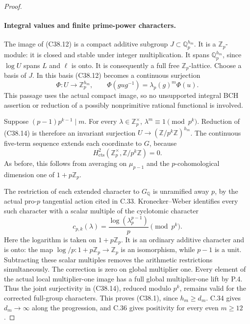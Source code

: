 \begin{proof}
\paragraph{Integral values and finite prime-power characters.}
The image of (C38.12) is a compact additive subgroup
\(J\subset\mathbb Q_p^{h_m}\).
It is a \(\mathbb Z_p\)-module: it is closed and stable
under integer multiplication.
It spans \(\mathbb Q_p^{h_m}\), since \(\log U\)
spans \(L\) and \(\ell\) is onto.
It is consequently a full free \(\mathbb Z_p\)-lattice.
Choose a basis of \(J\).  In this basis (C38.12) becomes
a continuous surjection
\[
                \Phi:U\longrightarrow\mathbb Z_p^{h_m},
       \qquad
       \Phi(gug^{-1})=\lambda_p(g)^m\Phi(u).
                                                               \tag{C38.14}
\]
This passage uses the actual compact image, so no
unsupported integral BCH assertion or reduction of a
possibly nonprimitive rational functional is involved.

Suppose \((p-1)p^{k-1}\mid m\).
For every \(\lambda\in\mathbb Z_p^\times\),
\(\lambda^m\equiv1\pmod{p^k}\).
Reduction of (C38.14) is therefore an invariant
surjection \(U\to(\mathbb Z/p^k\mathbb Z)^{h_m}\).
The continuous five-term sequence extends each coordinate
to \(G\), because
\[
 H^2_{\mathrm{cts}}(\mathbb Z_p^\times,\mathbb Z/p^k\mathbb Z)=0.
                                                               \tag{C38.15}
\]
As before, this follows from averaging on \(\mu_{p-1}\)
and the \(p\)-cohomological dimension one of
\(1+p\mathbb Z_p\).

The restriction of each extended character to
\(G_{\mathbb Q}\) is unramified away \(p\), by the
actual pro-\(p\) tangential action cited in C.33.
Kronecker--Weber identifies every such character with
a scalar multiple of the cyclotomic character
\[
 c_{p,k}(\lambda)=
        \frac{\log(\lambda_p^{p-1})}{p}\pmod{p^k}.
                                                               \tag{C38.16}
\]
Here the logarithm is taken on \(1+p\mathbb Z_p\).
It is an ordinary additive character and is onto:
the map \(\log/p:1+p\mathbb Z_p\to\mathbb Z_p\)
is an isomorphism, while \(p-1\) is a unit.
Subtracting these scalar multiples removes the
arithmetic restrictions simultaneously.
The correction is zero on global multiplier one.
Every element of the actual local multiplier-one image
has a full global multiplier-one lift by P.4.
Thus the joint surjectivity in (C38.14), reduced
modulo \(p^k\), remains valid for the corrected
full-group characters.
This proves (C38.1), since \(h_m\geq d_m\).
C.34 gives \(d_m\to\infty\) along the progression,
and C.36 gives positivity for every even \(m\geq12\).


\end{proof}
